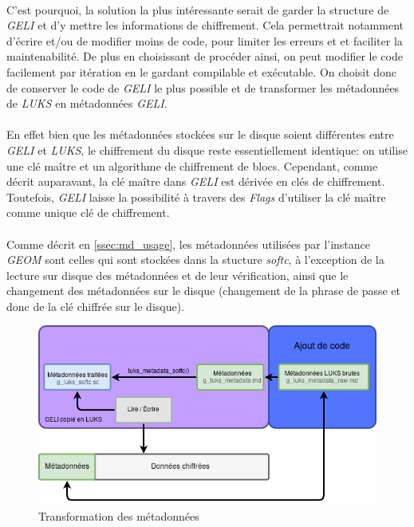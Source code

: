 \paragraph{}
C'est pourquoi, la solution la plus intéressante serait de garder la structure
de \textit{GELI} et d'y mettre les informations de chiffrement. Cela permettrait
notamment d'écrire et/ou de modifier moins de code, pour limiter les erreurs et
et faciliter la maintenabilité. De plus en choisissant de procéder ainsi, on
peut modifier le code facilement par itération en le gardant compilable et
exécutable. On choisit donc de conserver le code de \textit{GELI} le plus
possible et de transformer les métadonnées de \textit{LUKS} en métadonnées
\textit{GELI}.

\paragraph{}
En effet bien que les métadonnées stockées sur le disque soient différentes
entre \textit{GELI} et \textit{LUKS}, le chiffrement du disque reste
essentiellement identique: on utilise une clé maître et un algorithme de
chiffrement de blocs. Cependant, comme décrit auparavant, la clé maître dans
\textit{GELI} est dérivée en clés de chiffrement. Toutefois, \textit{GELI}
laisse la possibilité à travers des {\em Flags} d'utiliser la clé maître comme
unique clé de chiffrement.

\paragraph{}
Comme décrit en \ref{ssec:md_usage}, les métadonnées utilisées par l'instance
\textit{GEOM} sont celles qui sont stockées dans la stucture {\em softc}, à
l'exception de la lecture sur disque des métadonnées et de leur vérification,
ainsi que le  changement des métadonnées sur le disque (changement de la phrase
de passe et donc de la clé chiffrée sur le disque).

\begin{figure}[h]
  \centering
  \includegraphics[width=.9\linewidth]{choix_developpement/utilisation_metadonnee_luks.png}
  \caption{\label{fig:transformation_md}Transformation des métadonnées}
\end{figure}

